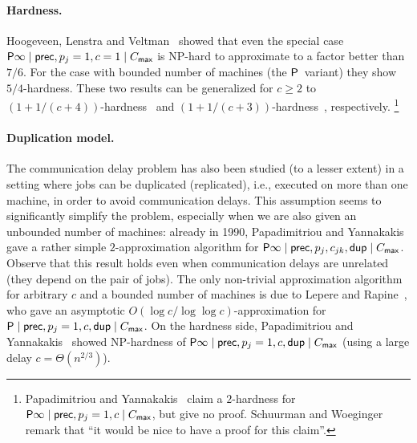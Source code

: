 \paragraph{Hardness.}
Hoogeveen, Lenstra and Veltman~\cite{HoogeveenLV94} showed that even the special case $\mathsf{P} \infty \mid \mathsf{prec}, p_j=1, c=1 \mid C_{\mathsf{max}}$ is NP-hard to approximate to a factor  better than $7/6$.
For the case with bounded number of machines (the $\mathsf{P}$~variant)
they show $5/4$-hardness.
These two results can be generalized for $c \ge 2$ to $(1+1/(c+4))$-hardness~\cite{GiroudeauKMP08}
and $(1+1/(c+3))$-hardness~\cite{BampisGK96},
respectively.%
\footnote{
	Papadimitriou and Yannakakis~\cite{PapadimitriouY90} claim a $2$-hardness for
	$\mathsf{P} \infty \mid \mathsf{prec}, p_j=1, c \mid C_{\mathsf{max}}$,
	but give no proof.
	Schuurman and Woeginger~\cite{SW99a} remark that ``it would be nice to have a proof for this claim''.
}


\paragraph{Duplication model.}
The communication delay problem has also been studied (to a lesser extent) in a setting where jobs can be duplicated (replicated), i.e., executed on more than one machine, in order to avoid communication delays.
This assumption seems to significantly simplify the problem,
especially when we are also given an unbounded number of machines:
already in 1990,
Papadimitriou and Yannakakis~\cite{PapadimitriouY90} gave a rather simple $2$-approximation algorithm for $\mathsf{P} \infty \mid \mathsf{prec}, p_j, c_{jk}, \mathsf{dup} \mid C_{\mathsf{max}}$.
Observe that this result holds even when communication delays are unrelated (they depend on the pair of jobs).
The only non-trivial approximation algorithm for arbitrary $c$ and a bounded number of machines is due to Lepere and Rapine~\cite{LepereR02}, who gave an asymptotic $O(\log c / \log \log c)$-approximation for $\mathsf{P} \mid \mathsf{prec}, p_j=1, c, \mathsf{dup} \mid C_{\mathsf{max}}$.
On the hardness side,
Papadimitriou and Yannakakis~\cite{PapadimitriouY90}
showed NP-hardness of
$\mathsf{P} \infty \mid \mathsf{prec}, p_j=1, c, \mathsf{dup} \mid C_{\mathsf{max}}$
(using a large delay $c = \Theta(n^{2/3})$).

